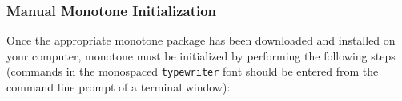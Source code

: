 \documentclass[12pt]{article}
\begin{document}

\subsubsection{Manual Monotone Initialization}

Once the appropriate monotone package has been downloaded and installed on your computer, monotone must be initialized by performing the following steps (commands in the monospaced {\tt \small typewriter} font should be entered from the command line prompt of a terminal window):
\end{document}
